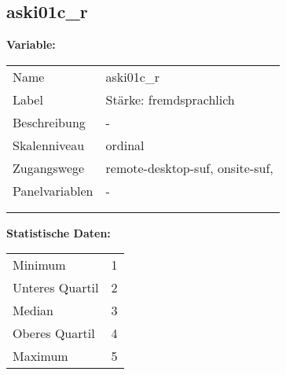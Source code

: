 	
	
	\subsection{aski01c\_r}
	\label{subSection:aski01c_r}

	\noindent\textbf{Variable:}\\
		\begin{tabular}{lL{11.3cm}}
			\label{tableVariable:aski01c_r}
			Name & aski01c\_r \\
			Label & Stärke: fremdsprachlich \\
			Beschreibung & - \\
			Skalenniveau & ordinal \\
			Zugangswege &
				remote-desktop-suf,
				onsite-suf,
 \\
			Panelvariablen & -
			 \\
			 \\
 \\
		\end{tabular}



		\vspace*{1 cm}
		\noindent\textbf{Statistische Daten:}\\
			\begin{tabular}{ll}
				\label{tableStatistics:aski01c_r}
					Minimum & 1 \\
					Unteres Quartil & 2 \\
					Median & 3 \\
					Oberes Quartil & 4 \\
					Maximum & 5 \\
			\end{tabular}



